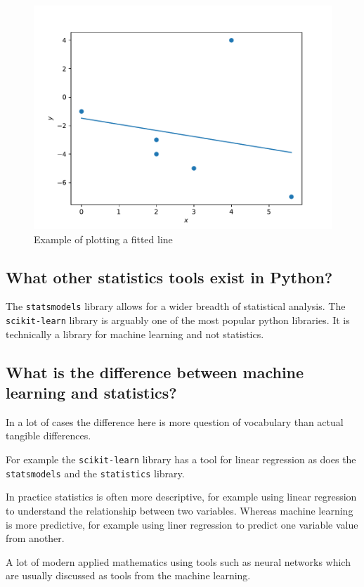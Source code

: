 \begin{figure}[!hbtp]
\begin{center}
\includegraphics[width=.7\textwidth]{./assets/example_plot_of_fitted_line/main.pdf}
\end{center}
\caption{Example of plotting a fitted line}
\label{fig:example_plot_of_fitted_line}
\end{figure}



\subsection{What other statistics tools exist in Python?}
\label{\detokenize{tools-for-mathematics/08-statistics/why/main:what-other-statistics-tools-exist-in-python}}

The \texttt{statsmodels} library allows for a wider breadth of statistical
analysis.
The \texttt{scikit-learn} library is arguably one of the most popular python libraries.
It is technically a library for machine learning and not statistics.


\subsection{What is the difference between machine learning and statistics?}
\label{\detokenize{tools-for-mathematics/08-statistics/why/main:what-is-the-difference-between-machine-learning-and-statistics}}

In a lot of cases the difference here is more question of vocabulary than
actual tangible differences.


For example the \texttt{scikit-learn} library has a tool for linear regression as does
the \texttt{statsmodels} and the \texttt{statistics} library.


In practice statistics is often more descriptive, for example using linear
regression to understand the relationship between two variables. Whereas machine
learning is more predictive, for example using liner regression to predict one
variable value from another.


A lot of modern applied mathematics using tools such as neural networks which
are usually discussed as tools from the machine learning.
